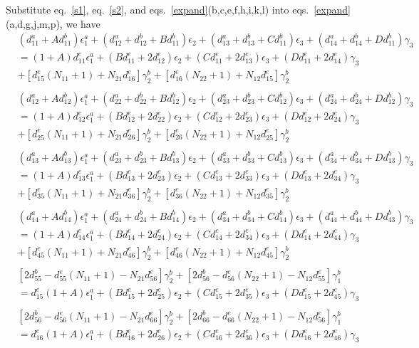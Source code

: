 \documentclass{article}
\begin{document}
Substitute eq.~\ref{s1}, eq.~\ref{s2}, and eqs.~\ref{expand}(b,c,e,f,h,i,k,l) into eqs.~\ref{expand}(a,d,g,j,m,p), we have
\begin{subequations}
\begin{align*}
&(d_{11}^a+Ad_{11}^b)\epsilon_1^a + (d_{12}^a+d_{12}^b+Bd_{11}^b)\epsilon_2 + (d_{13}^a+d_{13}^b+Cd_{11}^b)\epsilon_3 + (d_{14}^a+d_{14}^b+Dd_{11}^b)\gamma_3 \\ & = (1+A)d_{11}^e\epsilon_1^a + (Bd_{11}^e+2d_{12}^e)\epsilon_2 + (Cd_{11}^e+2d_{13}^e)\epsilon_3 + (Dd_{11}^e+2d_{14}^e)\gamma_3 \\ & + [d_{15}^e(N_{11}+1)+N_{21}d_{16}^e]\gamma_2^b + [d_{16}^e(N_{22}+1)+N_{12}d_{15}^e]\gamma_2^b  \\
\\
&(d_{12}^a+Ad_{12}^b)\epsilon_1^a + (d_{22}^a+d_{22}^b+Bd_{12}^b)\epsilon_2 + (d_{23}^a+d_{23}^b+Cd_{12}^b)\epsilon_3 + (d_{24}^a+d_{24}^b+Dd_{12}^b)\gamma_3 \\ & = (1+A)d_{12}^e\epsilon_1^a + (Bd_{12}^e+2d_{22}^e)\epsilon_2 + (Cd_{12}^e+2d_{23}^e)\epsilon_3 + (Dd_{12}^e+2d_{24}^e)\gamma_3 \\ & + [d_{25}^e(N_{11}+1)+N_{21}d_{26}^e]\gamma_2^b + [d_{26}^e(N_{22}+1)+N_{12}d_{25}^e]\gamma_2^b  \\
\\
&(d_{13}^a+Ad_{13}^b)\epsilon_1^a + (d_{23}^a+d_{23}^b+Bd_{13}^b)\epsilon_2 + (d_{33}^a+d_{33}^b+Cd_{13}^b)\epsilon_3 + (d_{34}^a+d_{34}^b+Dd_{13}^b)\gamma_3 \\ & = (1+A)d_{13}^e\epsilon_1^a + (Bd_{13}^e+2d_{23}^e)\epsilon_2 + (Cd_{13}^e+2d_{33}^e)\epsilon_3 + (Dd_{13}^e+2d_{34}^e)\gamma_3 \\ & + [d_{35}^e(N_{11}+1)+N_{21}d_{36}^e]\gamma_2^b + [d_{36}^e(N_{22}+1)+N_{12}d_{35}^e]\gamma_2^b  \\
\\
&(d_{14}^a+Ad_{14}^b)\epsilon_1^a + (d_{24}^a+d_{24}^b+Bd_{14}^b)\epsilon_2 + (d_{34}^a+d_{34}^b+Cd_{14}^b)\epsilon_3 + (d_{44}^a+d_{44}^b+Dd_{43}^b)\gamma_3 \\ & = (1+A)d_{14}^e\epsilon_1^a + (Bd_{14}^e+2d_{24}^e)\epsilon_2 + (Cd_{14}^e+2d_{34}^e)\epsilon_3 + (Dd_{14}^e+2d_{44}^e)\gamma_3 \\ & + [d_{45}^e(N_{11}+1)+N_{21}d_{46}^e]\gamma_2^b + [d_{46}^e(N_{22}+1)+N_{12}d_{45}^e]\gamma_2^b  \\
\\
&[2d_{55}^b-d_{55}^e(N_{11}+1)-N_{21}d_{56}^e]\gamma_2^b + [2d_{56}^b-d_{56}^e(N_{22}+1)-N_{12}d_{55}^e]\gamma_1^b \\ & = d_{15}^e(1+A)\epsilon_1^a + (Bd_{15}^e+2d_{25}^e)\epsilon_2 + (Cd_{15}^e+2d_{35}^e)\epsilon_3 +(Dd_{15}^e+2d_{45}^e)\gamma_3 \\
\\
&[2d_{56}^b-d_{56}^e(N_{11}+1)-N_{21}d_{66}^e]\gamma_2^b + [2d_{66}^b-d_{66}^e(N_{22}+1)-N_{12}d_{56}^e]\gamma_1^b \\ & = d_{16}^e(1+A)\epsilon_1^a + (Bd_{16}^e+2d_{26}^e)\epsilon_2 + (Cd_{16}^e+2d_{36}^e)\epsilon_3 +(Dd_{16}^e+2d_{46}^e)\gamma_3 
\end{align*}
\end{subequations}
\end{document}
